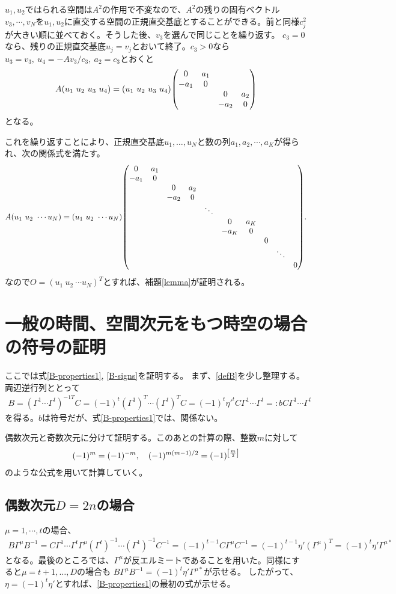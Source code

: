 \documentclass[12pt,a4paper]{jlreq}
\begin{document}
$u_1,u_2$ではられる空間は$A^2$の作用で不変なので、$A^2$の残りの固有ベクトル$v_3,\cdots,v_N$を$u_1,u_2$に直交する空間の正規直交基底とすることができる。前と同様$c_j^2$が大きい順に並べておく。そうした後、$v_3$を選んで同じことを繰り返す。
$c_3=0$なら、残りの正規直交基底$u_j=v_j$とおいて終了。$c_3 > 0$なら$u_3=v_3,\ u_4=-Av_3/c_3,\  a_2=c_3$とおくと
\begin{align*}
  A(u_1 \ u_2 \ u_3 \ u_4)=(u_1 \ u_2 \ u_3 \ u_4)\mqty(\dmat{0&a_1\\-a_1&0, 0&a_2\\-a_2&0})
\end{align*}
となる。

これを繰り返すことにより、正規直交基底$u_1,\dots,u_N$と数の列$a_1,a_2,\cdots,a_K$が得られ、次の関係式を満たす。
\begin{align*}
  A(u_1\ u_2\ \cdots u_N)=(u_1\ u_2\ \cdots u_N)
  \mqty(\dmat{0&a_1\\-a_1&0, 0&a_2\\-a_2&0,\ddots,0&a_K\\-a_K&0, 0, \ddots,0}).
\end{align*}
なので$O=(u_1\ u_2\ \cdots u_N)^T$とすれば、補題\ref{lemma}が証明される。


\section{一般の時間、空間次元をもつ時空の場合の符号の証明}
\label{app:proofB}
ここでは式\eqref{B-properties1}, \eqref{B-signs}を証明する。
まず、\eqref{defB}を少し整理する。両辺逆行列ととって
\begin{align*}
  B=(\Gamma^{1} \cdots \Gamma^{t})^{-1 T} C
  =(-1)^t (\Gamma^{1})^T \cdots (\Gamma^{t})^{T} C
  =(-1)^t \eta'^t C \Gamma^{1} \cdots \Gamma^{t}
  =: b C \Gamma^{1} \cdots \Gamma^{t}
\end{align*}
を得る。$b$は符号だが、式\eqref{B-properties1}では、関係ない。

偶数次元と奇数次元に分けて証明する。このあとの計算の際、整数$m$に対して
\begin{align*}
  (-1)^m=(-1)^{-m},\quad
  (-1)^{m(m-1)/2}=(-1)^{\qty[\frac{m}{2}]}
\end{align*}
のような公式を用いて計算していく。

\subsection{偶数次元$D=2n$の場合}
$\mu=1,\cdots,t$の場合、
\begin{align*}
  B\Gamma^{\mu}B^{-1}
  =C \Gamma^{1} \cdots \Gamma^{t} \Gamma^{\mu} (\Gamma^{t})^{-1} \cdots (\Gamma^{1})^{-1} C^{-1}
  =(-1)^{t-1} C\Gamma^{\mu}C^{-1}
  =(-1)^{t-1} \eta' (\Gamma^{\mu})^T
  =(-1)^{t} \eta' \Gamma^{\mu*}
\end{align*}
となる。最後のところでは、$\Gamma^{\mu}$が反エルミートであることを用いた。同様にすると$\mu=t+1,\dots,D$の場合も
$B\Gamma^{\mu}B^{-1}=(-1)^{t}\eta'\Gamma^{\mu *}$が示せる。
したがって、$\eta=(-1)^t \eta'$とすれば、\eqref{B-properties1}の最初の式が示せる。
\end{document}
